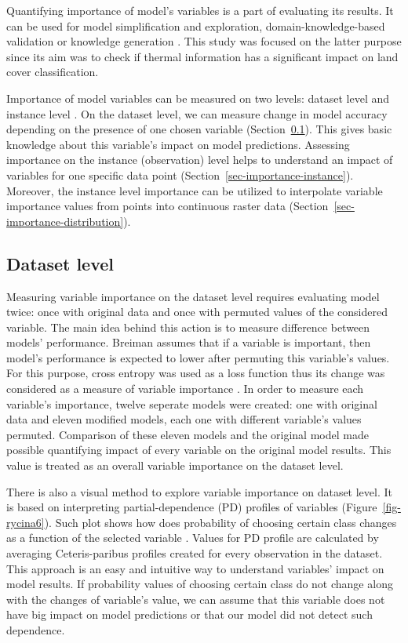 \documentclass{amuthesis}
\begin{document}
Quantifying importance of model's variables is a part of evaluating its
results. It can be used for model simplification and exploration,
domain-knowledge-based validation or knowledge generation
\autocite{biecek_explanatory_2021}. This study was focused on the latter
purpose since its aim was to check if thermal information has a
significant impact on land cover classification.

Importance of model variables can be measured on two levels: dataset
level and instance level \autocite{biecek_explanatory_2021}. On the
dataset level, we can measure change in model accuracy depending on the
presence of one chosen variable (Section~\ref{sec-importance-dataset}).
This gives basic knowledge about this variable's impact on model
predictions. Assessing importance on the instance (observation) level
helps to understand an impact of variables for one specific data point
(Section~\ref{sec-importance-instance}). Moreover, the instance level
importance can be utilized to interpolate variable importance values
from points into continuous raster data
(Section~\ref{sec-importance-distribution}).

\hypertarget{sec-importance-dataset}{%
\subsection{Dataset level}\label{sec-importance-dataset}}

Measuring variable importance on the dataset level requires evaluating
model twice: once with original data and once with permuted values of
the considered variable. The main idea behind this action is to measure
difference between models' performance. Breiman
\autocite*{breiman_random_2001} assumes that if a variable is important,
then model's performance is expected to lower after permuting this
variable's values. For this purpose, cross entropy was used as a loss
function thus its change was considered as a measure of variable
importance \autocite{biecek_explanatory_2021}. In order to measure each
variable's importance, twelve seperate models were created: one with
original data and eleven modified models, each one with different
variable's values permuted. Comparison of these eleven models and the
original model made possible quantifying impact of every variable on the
original model results. This value is treated as an overall variable
importance on the dataset level.

There is also a visual method to explore variable importance on dataset
level. It is based on interpreting partial-dependence (PD) profiles of
variables (Figure~\ref{fig-rycina6}). Such plot shows how does
probability of choosing certain class changes as a function of the
selected variable \autocite{biecek_explanatory_2021}. Values for PD
profile are calculated by averaging Ceteris-paribus profiles created for
every observation in the dataset. This approach is an easy and intuitive
way to understand variables' impact on model results. If probability
values of choosing certain class do not change along with the changes of
variable's value, we can assume that this variable does not have big
impact on model predictions or that our model did not detect such
dependence.
\end{document}
